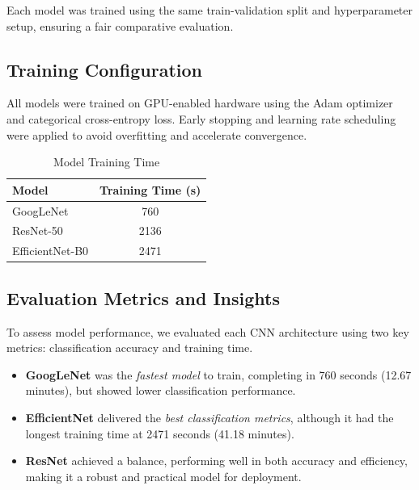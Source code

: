\documentclass[11pt,twocolumn]{article}
\begin{document}
Each model was trained using the same train-validation split and hyperparameter setup, ensuring a fair comparative evaluation.


\subsection{Training Configuration}
All models were trained on GPU-enabled hardware using the Adam optimizer and categorical cross-entropy loss. Early stopping and learning rate scheduling were applied to avoid overfitting and accelerate convergence.

\begin{table}[h]
\centering
\caption{Model Training Time}


\begin{tabular}{lc}
\hline
\textbf{Model} & \textbf{Training Time (s)} \\
\hline

GoogLeNet & 760 \\
ResNet-50 & 2136 \\
EfficientNet-B0 & 2471 \\

\hline
\end{tabular}
\label{tab:training_time}
\end{table}

\subsection{Evaluation Metrics and Insights}
\label{sec:evaluation}

To assess model performance, we evaluated each CNN architecture using two key metrics: classification accuracy and training time.

\begin{itemize}
    \item \textbf{GoogLeNet} was the \textit{fastest model} to train, completing in 760 seconds (12.67 minutes), but showed lower classification performance.
    \item \textbf{EfficientNet} delivered the \textit{best classification metrics}, although it had the longest training time at 2471 seconds (41.18 minutes).
    \item \textbf{ResNet} achieved a balance, performing well in both accuracy and efficiency, making it a robust and practical model for deployment.
\end{itemize}
\end{document}
